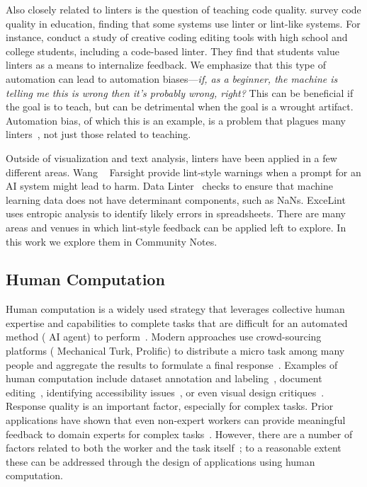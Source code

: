 Also closely related to linters is the question of teaching code quality.  \citet{keuning2023systematic} survey code quality in education, finding that some systems use linter or lint-like systems.
For instance, \citet{mcnutt2023study} conduct a study of creative coding editing tools with high school and college students, including a code-based linter. They find that students value linters as a means to internalize feedback.
We emphasize that this type of automation can lead to automation biases---\emph{if, as a beginner, the machine is telling me this is wrong then it's probably wrong, right?} This can be beneficial if the goal is to teach, but can be detrimental when the goal is a wrought artifact.
Automation bias, of which this is an example, is a problem that plagues many linters~\cite{chen2021vizlinter, lei2023geolinter}, not just those related to teaching.

Outside of visualization and text analysis, linters have been applied in a few different areas.
Wang \etals{}~\cite{wang2024farsight} Farsight provide lint-style warnings when a prompt for an AI system might lead to harm.
Data Linter~\cite{hynes2017data} checks to ensure that machine learning data does not have determinant components, such as NaNs.
ExceLint~\cite{barowy2018excelint} uses entropic analysis to identify likely errors in spreadsheets.
There are many areas and venues in which lint-style feedback can be applied left to explore. In this work we explore them in Community Notes.




















\subsection{Human Computation}\label{sec:rw_hc}
Human computation is a widely used strategy that leverages collective human expertise and capabilities to complete tasks that are difficult for an automated method (\eg{} AI agent) to perform~\cite{Quinn:HC_taxonomy:2011}. Modern approaches use crowd-sourcing platforms (\eg{} Mechanical Turk, Prolific) to distribute a micro task among many people and aggregate the results to formulate a final response~\cite{lazar:human_comp:2017}.
Examples of human computation include dataset annotation and labeling~\cite{snow:labelling:2008,Chang:Revolt:2017}, document editing~\cite{Bernstein:Soylent:2010}, identifying accessibility issues~\cite{Hara:HC_accessibility:2013}, or even visual design critiques~\cite{Xu:Voyant:2014,Luther:CrowdCrit:2015}.
Response quality is an important factor, especially for complex tasks. Prior applications have shown that even non-expert workers can provide meaningful feedback to domain experts for complex tasks~\cite{Xu:Voyant:2014,Luther:CrowdCrit:2015}. However, there are a number of factors related to both the worker and the task itself~\cite{Allahbakhsh:CrowdIssues:2013}; to a reasonable extent these can be addressed through the design of applications using human computation.

